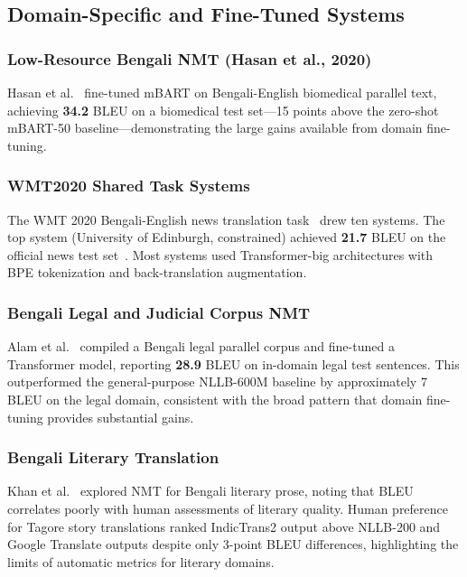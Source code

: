 \documentclass[conference]{IEEEtran}
\begin{document}
\subsection{Domain-Specific and Fine-Tuned Systems}

\subsubsection{Low-Resource Bengali NMT (Hasan et al., 2020)}
Hasan et al.~\cite{hasan2020low} fine-tuned mBART on Bengali-English
biomedical parallel text, achieving \textbf{34.2} BLEU on a biomedical
test set---15 points above the zero-shot mBART-50 baseline---demonstrating
the large gains available from domain fine-tuning.

\subsubsection{WMT2020 Shared Task Systems}
The WMT 2020 Bengali-English news translation task~\cite{barrault2020wmt}
drew ten systems.
The top system (University of Edinburgh, constrained) achieved
\textbf{21.7} BLEU on the official news test set~\cite{barrault2020wmt}.
Most systems used Transformer-big architectures with BPE tokenization
and back-translation augmentation.

\subsubsection{Bengali Legal and Judicial Corpus NMT}
Alam et al.~\cite{alam2021bengali} compiled a Bengali legal parallel
corpus and fine-tuned a Transformer model, reporting \textbf{28.9} BLEU
on in-domain legal test sentences.
This outperformed the general-purpose NLLB-600M baseline by approximately
7 BLEU on the legal domain, consistent with the broad pattern that
domain fine-tuning provides substantial gains.

\subsubsection{Bengali Literary Translation}
Khan et al.~\cite{khan2023literary} explored NMT for Bengali literary
prose, noting that BLEU correlates poorly with human assessments of
literary quality.
Human preference for Tagore story translations ranked IndicTrans2 output
above NLLB-200 and Google Translate outputs despite only 3-point BLEU
differences, highlighting the limits of automatic metrics for literary
domains.
\end{document}
